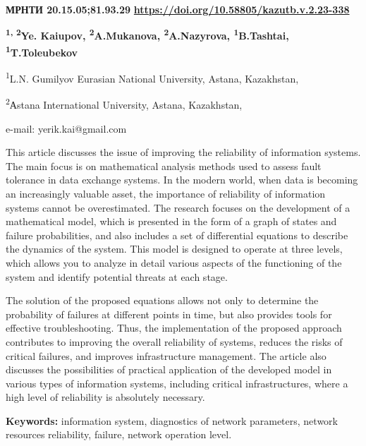 \newpage
{\bfseries МРНТИ 20.15.05;81.93.29}
\hfill {\bfseries \href{https://doi.org/10.58805/kazutb.v.2.23-338}{https://doi.org/10.58805/kazutb.v.2.23-338}}


\begin{center}
{\bfseries \textsuperscript{1, 2}Ye. Kaiupov,
\textsuperscript{2}A.Mukanova, \textsuperscript{2}A.Nazyrova,
\textsuperscript{1}B.Tashtai, \textsuperscript{1}T.Toleubekov}

\textsuperscript{1}L.N. Gumilyov Eurasian National University, Astana,
Kazakhstan,

\textsuperscript{2}Аstana International University, Astana, Kazakhstan,

e-mail: yerik.kai@gmail.com
\end{center}

This article discusses the issue of improving the reliability of
information systems. The main focus is on mathematical analysis methods
used to assess fault tolerance in data exchange systems. In the modern
world, when data is becoming an increasingly valuable asset, the
importance of reliability of information systems cannot be
overestimated. The research focuses on the development of a mathematical
model, which is presented in the form of a graph of states and failure
probabilities, and also includes a set of differential equations to
describe the dynamics of the system. This model is designed to operate
at three levels, which allows you to analyze in detail various aspects
of the functioning of the system and identify potential threats at each
stage.

The solution of the proposed equations allows not only to determine the
probability of failures at different points in time, but also provides
tools for effective troubleshooting. Thus, the implementation of the
proposed approach contributes to improving the overall reliability of
systems, reduces the risks of critical failures, and improves
infrastructure management. The article also discusses the possibilities
of practical application of the developed model in various types of
information systems, including critical infrastructures, where a high
level of reliability is absolutely necessary.

{\bfseries Keywords:} information system, diagnostics of network
parameters, network resources reliability, failure, network operation
level.


